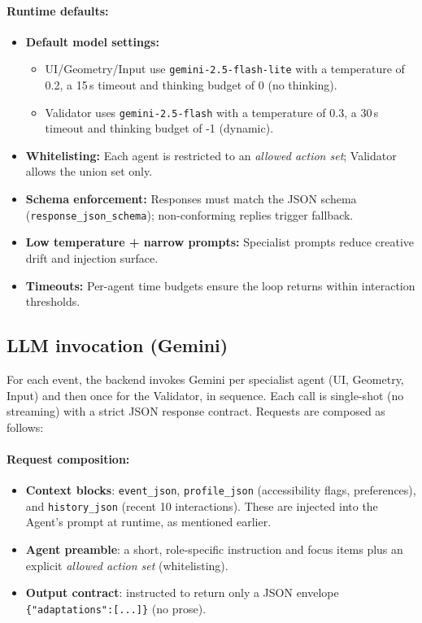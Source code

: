 \documentclass[openany]{book}
\begin{document}
\paragraph{Runtime defaults:}
\begin{itemize}
  \item \textbf{Default model settings:} 
    \begin{itemize}
        \item UI/Geometry/Input use \texttt{gemini-2.5-flash-lite} with a temperature of 0.2, a 15\,s timeout and thinking budget of 0 (no thinking).
        \item Validator uses \texttt{gemini-2.5-flash} with a temperature of 0.3, a 30\,s timeout and thinking budget of -1 (dynamic).
    \end{itemize}
  \item \textbf{Whitelisting:} Each agent is restricted to an \emph{allowed action set}; Validator allows the union set only.
  \item \textbf{Schema enforcement:} Responses must match the JSON schema (\texttt{response\_json\_schema}); non-conforming replies trigger fallback.
  \item \textbf{Low temperature + narrow prompts:} Specialist prompts reduce creative drift and injection surface.
  \item \textbf{Timeouts:} Per-agent time budgets ensure the loop returns within interaction thresholds.
\end{itemize}
\newpage

\subsection{LLM invocation (Gemini)}
For each event, the backend invokes Gemini per specialist agent (UI, Geometry, Input) and then once for the Validator, in sequence. Each call is single-shot (no streaming) with a strict JSON response contract. Requests are composed as follows:

\paragraph{Request composition:}
\begin{itemize}
  \item \textbf{Context blocks}: \texttt{event\_json}, \texttt{profile\_json} (accessibility flags, preferences), and \texttt{history\_json} (recent 10 interactions). These are injected into the Agent's prompt at runtime, as mentioned earlier.
  \item \textbf{Agent preamble}: a short, role-specific instruction and focus items plus an explicit \emph{allowed action set} (whitelisting).
  \item \textbf{Output contract}: instructed to return only a JSON envelope \texttt{\{"adaptations":[...]\}} (no prose).
\end{itemize}
\end{document}
